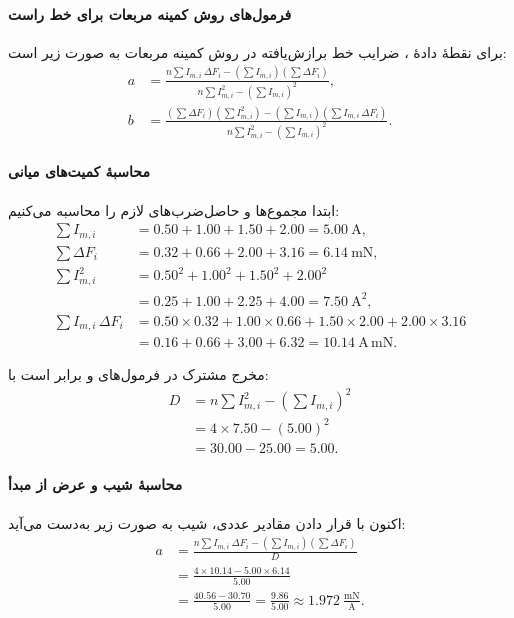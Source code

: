 \documentclass[a4paper, 11pt]{article}
\begin{document}
\paragraph{فرمول‌های روش کمینه مربعات برای خط راست}
برای  نقطهٔ دادهٔ ، ضرایب خط برازش‌یافته  در روش کمینه مربعات به صورت زیر است:
\begin{align}
a &= \frac{n\sum I_{m,i}\,\Delta F_i - \left(\sum I_{m,i}\right)\left(\sum \Delta F_i\right)}
         {n\sum I_{m,i}^2 - \left(\sum I_{m,i}\right)^2}, \\
b &= \frac{\left(\sum \Delta F_i\right)\left(\sum I_{m,i}^2\right) - \left(\sum I_{m,i}\right)\left(\sum I_{m,i}\,\Delta F_i\right)}
         {n\sum I_{m,i}^2 - \left(\sum I_{m,i}\right)^2}.
\end{align}


\paragraph{محاسبهٔ کمیت‌های میانی}
ابتدا مجموع‌ها و حاصل‌ضرب‌های لازم را محاسبه می‌کنیم:
\begin{align}
\sum I_{m,i} &= 0.50 + 1.00 + 1.50 + 2.00 = 5.00~\mathrm{A}, \\
\sum \Delta F_i &= 0.32 + 0.66 + 2.00 + 3.16 = 6.14~\mathrm{mN}, \\
\sum I_{m,i}^2 &= 0.50^2 + 1.00^2 + 1.50^2 + 2.00^2 \nonumber\\
&= 0.25 + 1.00 + 2.25 + 4.00 = 7.50~\mathrm{A}^2, \\
\sum I_{m,i}\,\Delta F_i &= 0.50\times 0.32 + 1.00\times 0.66 + 1.50\times 2.00 + 2.00\times 3.16 \nonumber\\
&= 0.16 + 0.66 + 3.00 + 6.32 = 10.14~\mathrm{A\,mN}.
\end{align}

مخرج مشترک در فرمول‌های  و  برابر است با:
\begin{align}
D &= n\sum I_{m,i}^2 - \left(\sum I_{m,i}\right)^2 \nonumber\\
  &= 4\times 7.50 - (5.00)^2 \nonumber\\
  &= 30.00 - 25.00 = 5.00.
\end{align}

\paragraph{محاسبهٔ شیب و عرض از مبدأ}
اکنون با قرار دادن مقادیر عددی، شیب  به صورت زیر به‌دست می‌آید:
\begin{align}
a &= \frac{n\sum I_{m,i}\,\Delta F_i - \left(\sum I_{m,i}\right)\left(\sum \Delta F_i\right)}
         {D} \nonumber\\
  &= \frac{4\times 10.14 - 5.00\times 6.14}{5.00} \nonumber\\
  &= \frac{40.56 - 30.70}{5.00} 
   = \frac{9.86}{5.00} 
   \approx 1.972~\frac{\mathrm{mN}}{\mathrm{A}}.
\end{align}
\end{document}
